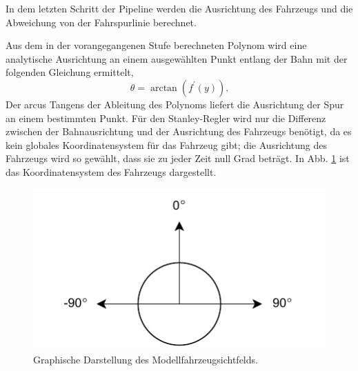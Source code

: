 \documentclass[arbeit=studie,oneside,BCOR=12mm]{ArbeitRST}
\begin{document}
In dem letzten Schritt der Pipeline werden die Ausrichtung des Fahrzeugs und die Abweichung von
der Fahrspurlinie berechnet. 

Aus dem in der vorangegangenen Stufe berechneten Polynom wird eine
analytische Ausrichtung an einem ausgewählten Punkt entlang der Bahn mit der
folgenden Gleichung ermittelt, 
\begin{equation} 
    \theta = \arctan(f^\prime(y)).
\end{equation} 
Der arcus Tangens der Ableitung des Polynoms liefert die
Ausrichtung der Spur an einem bestimmten Punkt. Für den Stanley-Regler wird nur die
Differenz zwischen der Bahnausrichtung und der Ausrichtung des Fahrzeugs
benötigt, da es kein globales Koordinatensystem für das Fahrzeug gibt; die
Ausrichtung des Fahrzeugs wird so gewählt, dass sie zu jeder Zeit null Grad
beträgt. In Abb. \ref{ausrichtung} ist das Koordinatensystem des Fahrzeugs
dargestellt. 

\begin{figure}[h]
    \centering
    \includegraphics{fov}
    \caption{Graphische Darstellung des Modellfahrzeugsichtfelds.}
    \label{ausrichtung}
\end{figure}

\end{document}
